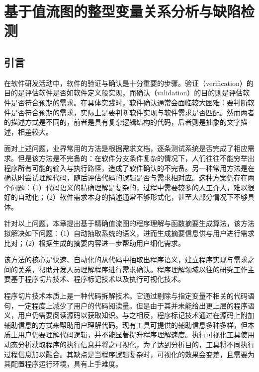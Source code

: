 
\chapter{基于值流图的整型变量关系分析与缺陷检测}

\section{引言}

在软件研发活动中，软件的验证与确认\cite{wagner2016functionally, wallace1989software}是十分重要的步骤。验证（verification）的目的是评估软件是否如软件定义般实现，而确认（validation）的目的则是评估软件是否符合预期的需求。在具体实践时，软件确认通常会面临较大困难\cite{wagner2013software}：要判断软件是否符合预期的需求，实际上是要判断软件实现与软件需求是否匹配。然而两者的描述方式是不同的，前者是具有复杂逻辑结构的代码，后者则是抽象的文字描述，相差较大。

面对上述问题，业界常用的方法是根据需求文档，逐条测试系统是否完成了相应需求\cite{ramler2006value}。但是该方法是不完备的：在软件分支条件复杂的情况下，人们往往不能穷举出程序所有可能的输入与执行路径，造成了软件确认的不完备。另一种常用方法是在确认时尝试理解代码，随后评估代码的逻辑是否与需求相对应。这种方案仍存在两个问题：（1）代码语义的精确理解是复杂的，过程中需要较多的人工介入\cite{ko2007information, murphy2006java, corbi1989program}，难以很好的自动化；（2）软件需求本身的描述通常不够形式化，甚至大部分情况下不够具体。

针对以上问题，本章提出基于精确值流图的程序理解与函数摘要生成算法，该方法拟解决如下问题：（1）自动抽取系统的语义，进而生成摘要信息供与用户进行需求比对；（2）根据生成的摘要内容进一步帮助用户细化需求。

该方法的核心是快速、自动化的从代码中抽取出程序语义，建立程序实现与需求之间的关系，帮助开发人员理解程序进行需求确认。程序理解\cite{boysen1979factors, sackman1968exploratory}领域以往的研究工作主要基于程序切片技术、程序标记技术以及执行可视化技术。

程序切片技术\cite{binkley1996program}本质上是一种代码拆解技术。它通过剔除与指定变量不相关的代码语句，一定程度上减少了用户的代码阅读量。但是由于其并未能给出更上层的程序语义，用户仍需要阅读源码以获取知识。与之相反，程序标记技术\cite{sulir2017labeling}通过在源码上附加辅助信息的方式来帮助用户理解代码。现有工具可提供的辅助信息多种多样，但本质上用户仍要理解代码逻辑，并不能显著提升程序理解速度。执行可视化工具使用动态分析获取程序的执行信息并将之可视化，为了达到分析目的，工具将不同执行过程信息加以融合。其缺点是当程序逻辑复杂时，可视化的效果会变差，且需要为其配置程序运行环境，具有上手难度。 

